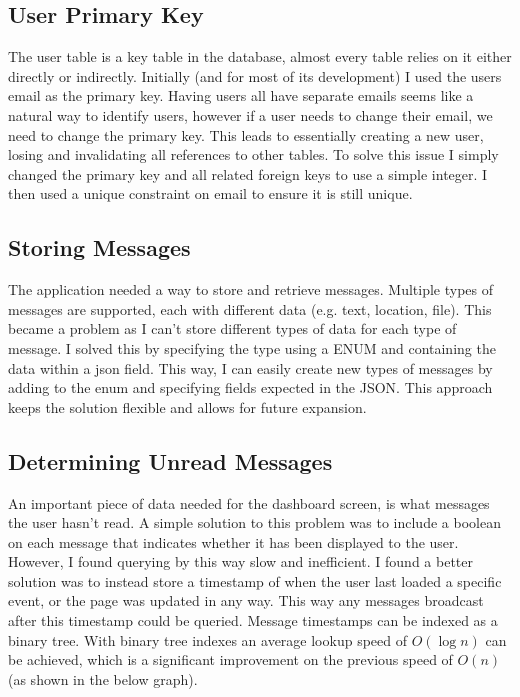 \documentclass[a4paper,oneside,12pt]{report}
\begin{document}
	\subsection{User Primary Key}
	The user table is a key table in the database, almost every table relies on it either directly or indirectly. Initially (and for most of its development) I used the users email as the primary key. Having users all have separate emails seems like a natural way to identify users, however if a user needs to change their email, we need to change the primary key. This leads to essentially creating a new user, losing and invalidating all references to other tables. To solve this issue I simply changed the primary key and all related foreign keys to use a simple integer. I then used a unique constraint on email to ensure it is still unique.

	\subsection{Storing Messages}
	The application needed a way to store and retrieve messages. Multiple types of messages are supported, each with different data (e.g. text, location, file). This became a problem as I can’t store different types of data for each type of message. I solved this by specifying the type using a ENUM and containing the data within a json field. This way, I can easily create new types of messages by adding to the enum and specifying fields expected in the JSON. This approach keeps the solution flexible and allows for future expansion.

	\subsection{Determining Unread Messages}
	An important piece of data needed for the dashboard screen, is what messages the user hasn’t read. A simple solution to this problem was to include a boolean on each message that indicates whether it has been displayed to the user. However, I found querying by this way slow and inefficient. I found a better solution was to instead store a timestamp of when the user last loaded a specific event, or the page was updated in any way. This way any messages broadcast after this timestamp could be queried. Message timestamps can be indexed as a binary tree. With binary tree indexes an average lookup speed of \(O(\log n)\) can be achieved, which is a significant improvement on the previous speed of \(O(n)\) (as shown in the below graph).
\end{document}
